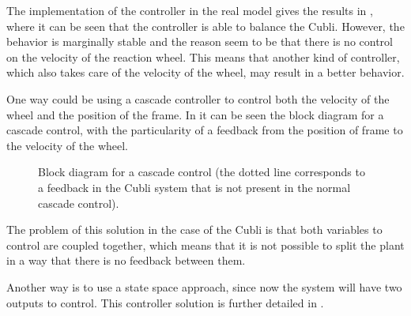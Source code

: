 The implementation of the controller in the real model gives the results in , where it can be seen that the controller is able to balance the Cubli. However, the behavior is marginally stable and the reason seem to be that there is no control on the velocity of the reaction wheel. This means that another kind of controller, which also takes care of the velocity of the wheel, may result in a better behavior.
%


One way could be using a cascade controller to control both the velocity of the wheel and the position of the frame. In  it can be seen the block diagram for a cascade control, with the particularity of a feedback from the position of frame to the velocity of the wheel.
%
\begin{figure}[H]
	
	\centering
	\caption{Block diagram for a cascade control (the dotted line corresponds to a feedback in the Cubli system that is not present in the normal cascade control).}
	\label{cascadeControl}
\end{figure}\vspace{-18pt}
%
The problem of this solution in the case of the Cubli is that both variables to control are coupled together, which means that it is not possible to split the plant in a way that there is no feedback between them.\cite{LRusso}

Another way is to use a state space approach, since now the system will have two outputs to control. This controller solution is further detailed in .
